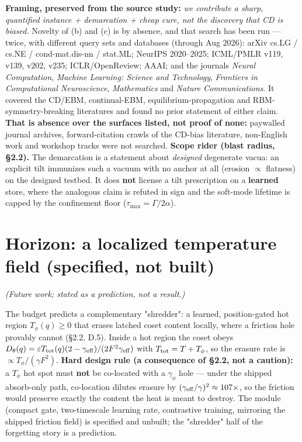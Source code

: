\documentclass{article}
\begin{document}
\textbf{Framing, preserved from the source study:} \emph{we contribute a sharp, quantified instance + demarcation + cheap cure, not the discovery that CD is biased.} Novelty of (b) and (c) is by absence, and that search has been run --- twice, with different query sets and databases (through Aug 2026): arXiv cs.LG / cs.NE / cond-mat.dis-nn / stat.ML; NeurIPS 2020--2025; ICML/PMLR v119, v139, v202, v235; ICLR/OpenReview; AAAI; and the journals \emph{Neural Computation}, \emph{Machine Learning: Science and Technology}, \emph{Frontiers in Computational Neuroscience}, \emph{Mathematics} and \emph{Nature Communications}. It covered the CD/EBM, continual-EBM, equilibrium-propagation and RBM-symmetry-breaking literatures and found no prior statement of either claim. \textbf{That is absence over the surfaces listed, not proof of none:} paywalled journal archives, forward-citation crawls of the CD-bias literature, non-English work and workshop tracks were not searched. \textbf{Scope rider (blast radius, \S 2.2).} The demarcation is a statement about \emph{designed} degenerate vacua: an explicit tilt immunizes such a vacuum with no anchor at all (erosion $\propto$ flatness) on the designed testbed. It does \textbf{not} license a tilt prescription on a \textbf{learned} store, where the analogous claim is refuted in sign and the soft-mode lifetime is capped by the confinement floor ($\tau_{\max}=\Gamma/2\alpha$).

\section{Horizon: a localized temperature field (specified, not built)}

\emph{(Future work; stated as a prediction, not a result.)}

The budget predicts a complementary "shredder": a learned, position-gated hot region $T_\phi(q)\ge0$ that erases latched coset content locally, where a friction hole provably cannot (\S 2.2, D.5). Inside a hot region the coset obeys $D_\theta(q)=\varepsilon T_{\rm tot}(q)(2-\gamma_{\rm eff})/(2F^2\gamma_{\rm eff})$ with $T_{\rm tot}=T+T_\phi$, so the erasure rate is $\propto T_\phi/(\gamma F^2)$. \textbf{Hard design rule (a consequence of \S 2.2, not a caution):} a $T_\phi$ hot spot must \textbf{not} be co-located with a $\gamma_\phi$ hole --- under the shipped absorb-only path, co-location dilutes erasure by $(\gamma_{\rm eff}/\gamma)^2\approx107\times$, so the friction would preserve exactly the content the heat is meant to destroy. The module (compact gate, two-timescale learning rate, contrastive training, mirroring the shipped friction field) is specified and unbuilt; the "shredder" half of the forgetting story is a prediction.
\end{document}
